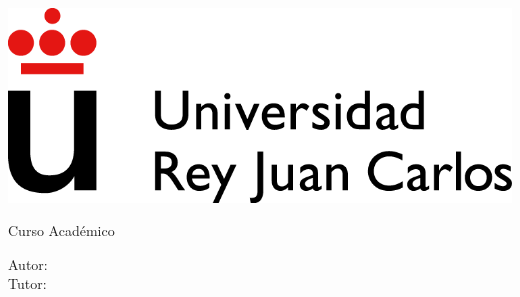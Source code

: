 
\begin{titlepage}
\begin{center}
\includegraphics[scale=0.8]{./images/URJ_logo_Color_POS.png}

\vspace{1.75cm}

\Large
\MakeUppercase{\program}

\vspace{0.4cm}

\large
Curso Académico \dateCourse

\vspace{0.8cm}

\type

\vspace{2.5cm}

\LARGE
\docTitle

\vspace{4cm}

\large
Autor: \docAuthor \\
Tutor: \tutor
\end{center}
\end{titlepage}

\newpage
\mbox{}
\thispagestyle{empty} %